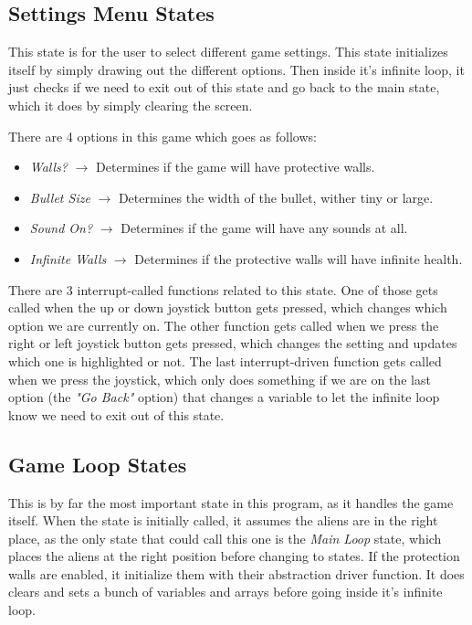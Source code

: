\documentclass[12pt, a4paper]{article}
\begin{document}
    \subsection{Settings Menu States}
    This state is for the user to select different game settings. This state initializes itself by simply drawing out the different options. Then inside it's infinite loop, it just checks if we need to exit out of this state and go back to the main state, which it does by simply clearing the screen. 
    
    There are 4 options in this game which goes as follows:
    \begin{itemize}[noitemsep]
     \item \textit{Walls?} $\rightarrow$ Determines if the game will have protective walls.
     \item \textit{Bullet Size} $\rightarrow$ Determines the width of the bullet, wither tiny or large.
     \item \textit{Sound On?} $\rightarrow$ Determines if the game will have any sounds at all.
     \item \textit{Infinite Walls} $\rightarrow$ Determines if the protective walls will have infinite health.
    \end{itemize}

    There are 3 interrupt-called functions related to this state. One of those gets called when the up or down joystick button gets pressed, which changes which option we are currently on. The other function gets called when we press the right or left joystick button gets pressed, which changes the setting and updates which one is highlighted or not. The last interrupt-driven function gets called when we press the joystick, which only does something if we are on the last option (the \textit{"Go Back"} option) that changes a variable to let the infinite loop know we need to exit out of this state.
    
    \subsection{Game Loop States} \label{subsec:loop:game}
    This is by far the most important state in this program, as it handles the game itself. When the state is initially called, it assumes the aliens are in the right place, as the only state that could call this one is the \textit{Main Loop} state, which places the aliens at the right position before changing to states. If the protection walls are enabled, it initialize them with their abstraction driver function. It does clears and sets a bunch of variables and arrays before going inside it's infinite loop.
    
\end{document}
